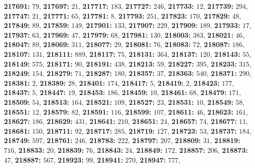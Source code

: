 \textsf{\bfseries 217691:} $79$, \textsf{\bfseries 217697:} $21$, \textsf{\bfseries 217717:} $183$, \textsf{\bfseries 217727:} $246$, \textsf{\bfseries 217733:} $12$, \textsf{\bfseries 217739:} $294$, \textsf{\bfseries 217747:} $21$, \textsf{\bfseries 217771:} $65$, \textsf{\bfseries 217781:} $8$, \textsf{\bfseries 217793:} $251$, \textsf{\bfseries 217823:} $170$, \textsf{\bfseries 217829:} $48$, \textsf{\bfseries 217849:} $89$, \textsf{\bfseries 217859:} $149$, \textsf{\bfseries 217901:} $133$, \textsf{\bfseries 217907:} $229$, \textsf{\bfseries 217909:} $189$, \textsf{\bfseries 217933:} $17$, \textsf{\bfseries 217937:} $63$, \textsf{\bfseries 217969:} $47$, \textsf{\bfseries 217979:} $68$, \textsf{\bfseries 217981:} $130$, \textsf{\bfseries 218003:} $383$, \textsf{\bfseries 218021:} $46$, \textsf{\bfseries 218047:} $89$, \textsf{\bfseries 218069:} $311$, \textsf{\bfseries 218077:} $29$, \textsf{\bfseries 218081:} $76$, \textsf{\bfseries 218083:} $72$, \textsf{\bfseries 218087:} $186$, \textsf{\bfseries 218107:} $131$, \textsf{\bfseries 218111:} $889$, \textsf{\bfseries 218117:} $75$, \textsf{\bfseries 218131:} $364$, \textsf{\bfseries 218137:} $120$, \textsf{\bfseries 218143:} $55$, \textsf{\bfseries 218149:} $575$, \textsf{\bfseries 218171:} $90$, \textsf{\bfseries 218191:} $438$, \textsf{\bfseries 218213:} $59$, \textsf{\bfseries 218227:} $395$, \textsf{\bfseries 218233:} $315$, \textsf{\bfseries 218249:} $154$, \textsf{\bfseries 218279:} $71$, \textsf{\bfseries 218287:} $180$, \textsf{\bfseries 218357:} $37$, \textsf{\bfseries 218363:} $540$, \textsf{\bfseries 218371:} $290$, \textsf{\bfseries 218381:} $2$, \textsf{\bfseries 218389:} $28$, \textsf{\bfseries 218401:} $174$, \textsf{\bfseries 218417:} $5$, \textsf{\bfseries 218419:} $2$, \textsf{\bfseries 218423:} $177$, \textsf{\bfseries 218437:} $5$, \textsf{\bfseries 218447:} $19$, \textsf{\bfseries 218453:} $186$, \textsf{\bfseries 218459:} $10$, \textsf{\bfseries 218461:} $68$, \textsf{\bfseries 218479:} $171$, \textsf{\bfseries 218509:} $54$, \textsf{\bfseries 218513:} $164$, \textsf{\bfseries 218521:} $109$, \textsf{\bfseries 218527:} $23$, \textsf{\bfseries 218531:} $10$, \textsf{\bfseries 218549:} $58$, \textsf{\bfseries 218551:} $12$, \textsf{\bfseries 218579:} $82$, \textsf{\bfseries 218591:} $116$, \textsf{\bfseries 218599:} $107$, \textsf{\bfseries 218611:} $46$, \textsf{\bfseries 218623:} $161$, \textsf{\bfseries 218627:} $186$, \textsf{\bfseries 218629:} $431$, \textsf{\bfseries 218641:} $210$, \textsf{\bfseries 218651:} $24$, \textsf{\bfseries 218657:} $74$, \textsf{\bfseries 218677:} $11$, \textsf{\bfseries 218681:} $150$, \textsf{\bfseries 218711:} $92$, \textsf{\bfseries 218717:} $285$, \textsf{\bfseries 218719:} $127$, \textsf{\bfseries 218723:} $53$, \textsf{\bfseries 218737:} $184$, \textsf{\bfseries 218749:} $597$, \textsf{\bfseries 218761:} $246$, \textsf{\bfseries 218783:} $222$, \textsf{\bfseries 218797:} $207$, \textsf{\bfseries 218809:} $31$, \textsf{\bfseries 218819:} $716$, \textsf{\bfseries 218833:} $20$, \textsf{\bfseries 218839:} $76$, \textsf{\bfseries 218843:} $24$, \textsf{\bfseries 218849:} $172$, \textsf{\bfseries 218857:} $206$, \textsf{\bfseries 218873:} $47$, \textsf{\bfseries 218887:} $567$, \textsf{\bfseries 218923:} $99$, \textsf{\bfseries 218941:} $270$, \textsf{\bfseries 218947:} $777$, 

